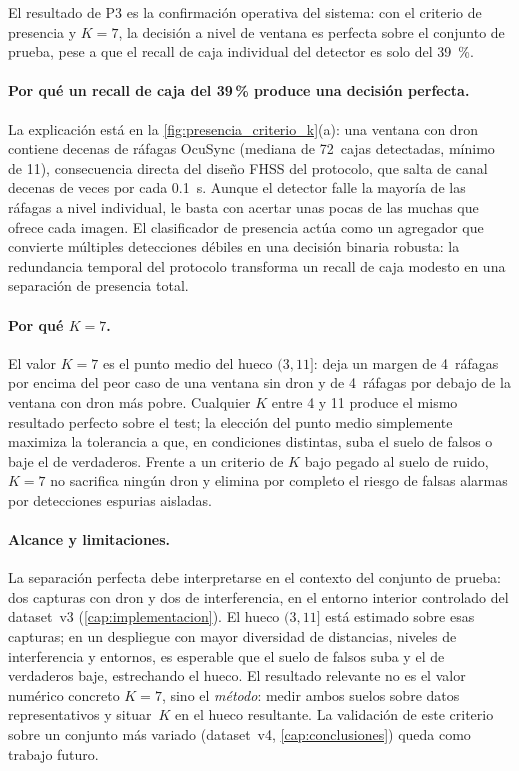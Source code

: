 El resultado de P3 es la confirmación operativa del sistema: con el criterio de presencia y $K=7$, la decisión a nivel de ventana es perfecta sobre el conjunto de prueba, pese a que el recall de caja individual del detector es solo del \SI{39}{\percent}.

\paragraph{Por qué un recall de caja del 39\,\% produce una decisión perfecta.}
La explicación está en la \cref{fig:presencia_criterio_k}(a): una ventana con dron contiene decenas de ráfagas OcuSync (mediana de \num{72}~cajas detectadas, mínimo de \num{11}), consecuencia directa del diseño FHSS del protocolo, que salta de canal decenas de veces por cada \SI{0.1}{\second}. Aunque el detector falle la mayoría de las ráfagas a nivel individual, le basta con acertar unas pocas de las muchas que ofrece cada imagen. El clasificador de presencia actúa como un agregador que convierte múltiples detecciones débiles en una decisión binaria robusta: la redundancia temporal del protocolo transforma un recall de caja modesto en una separación de presencia total.

\paragraph{Por qué $K=7$.}
El valor $K=7$ es el punto medio del hueco $(3, 11]$: deja un margen de \num{4}~ráfagas por encima del peor caso de una ventana sin dron y de \num{4}~ráfagas por debajo de la ventana con dron más pobre. Cualquier $K$ entre \num{4} y \num{11} produce el mismo resultado perfecto sobre el test; la elección del punto medio simplemente maximiza la tolerancia a que, en condiciones distintas, suba el suelo de falsos o baje el de verdaderos. Frente a un criterio de $K$ bajo pegado al suelo de ruido, $K=7$ no sacrifica ningún dron y elimina por completo el riesgo de falsas alarmas por detecciones espurias aisladas.

\paragraph{Alcance y limitaciones.}
La separación perfecta debe interpretarse en el contexto del conjunto de prueba: dos capturas con dron y dos de interferencia, en el entorno interior controlado del dataset~v3 (\cref{cap:implementacion}). El hueco $(3, 11]$ está estimado sobre esas capturas; en un despliegue con mayor diversidad de distancias, niveles de interferencia y entornos, es esperable que el suelo de falsos suba y el de verdaderos baje, estrechando el hueco. El resultado relevante no es el valor numérico concreto $K=7$, sino el \emph{método}: medir ambos suelos sobre datos representativos y situar~$K$ en el hueco resultante. La validación de este criterio sobre un conjunto más variado (dataset~v4, \cref{cap:conclusiones}) queda como trabajo futuro.
